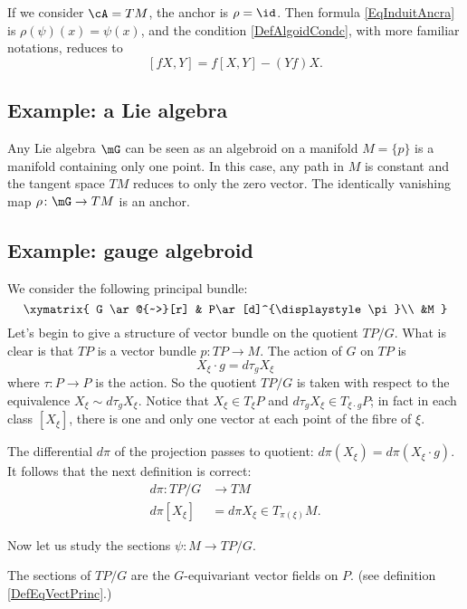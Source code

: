 If we consider $\cA=TM$, the anchor is $\rho=\id$. Then formula \eqref{EqInduitAncra} is $\rho(\psi)(x)=\psi(x)$, and the condition \eqref{DefAlgoidCondc}, with more familiar notations, reduces to
\[ 
  [fX,Y]=f[X,Y]-(Yf)X.
\]

\subsection{Example: a Lie algebra}

Any Lie algebra $\mG$ can be seen as an algebroid on a manifold $M=\{ p \}$ is a manifold containing only one point. In this case, any path in $M$ is constant and the tangent space $TM$ reduces to only the zero vector. The identically vanishing map $\rho\colon \mG\to TM$ is an anchor.

\subsection{Example: gauge algebroid}

We consider the following principal bundle:
\[
\xymatrix{
    G \ar@{~>}[r] & P\ar[d]^{\displaystyle \pi}\\ &M 
  }
\]
Let's begin to give a structure of vector bundle on the quotient $TP/G$. What is clear is that $TP$ is a vector bundle $p\colon TP\to M$. The action of $G$ on $TP$ is
\[ 
  X_{\xi}\cdot g=d\tau_{g}X_{\xi}
\]
where $\tau\colon P\to P$ is the action. So the quotient $TP/G$ is taken with respect to the equivalence $X_{\xi}\sim d\tau_{g}X_{\xi}$. Notice that $X_{\xi}\in T_{\xi}P$ and $d\tau_{g}X_{\xi}\in T_{\xi\cdot g}P$; in fact in each class $[X_{\xi}]$, there is one and only one vector at each point of the fibre of $\xi$.

The differential $d\pi$ of the projection passes to quotient: $d\pi(X_{\xi})=d\pi(X_{\xi}\cdot g)$. It follows that the next definition is correct:
\begin{equation}
\begin{aligned}
 d\pi\colon TP/G&\to TM \\ 
d\pi[X_{\xi}]&= d\pi X_{\xi}\in T_{\pi(\xi)}M. 
\end{aligned}
\end{equation}

Now let us study the sections $\psi\colon M\to TP/G$.

\begin{lemma}
The sections of $TP/G$ are the $G$-equivariant vector fields on $P$. (see definition \ref{DefEqVectPrinc}.)
\end{lemma}

